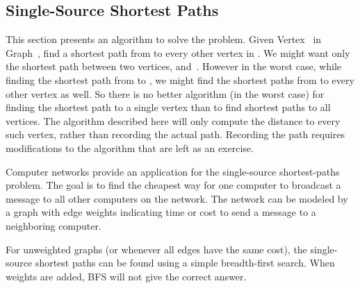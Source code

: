 
\subsection{Single-Source Shortest Paths}
\label{SSSP}

This section presents an algorithm to solve the
  problem.
Given Vertex~ in Graph~, find a shortest path from
 to every other vertex in .
We might want only the shortest path between two vertices,
 and~.
However in the worst case, while finding the shortest path from
 to , we might find the shortest paths from 
to every other vertex as well.
So there is no better algorithm (in the worst case) for
finding the shortest path to a single vertex than to find shortest
paths to all vertices.
The algorithm described here will only compute the distance to every
such vertex, rather than recording the actual path.
Recording the path requires modifications to the algorithm that
are left as an exercise.

Computer networks provide an application for the single-source
shortest-paths problem.
The goal is to find the cheapest way for one computer to broadcast
a message to all other computers on the network.
The network can be modeled by a graph with edge weights indicating time or
cost to send a message to a neighboring computer.

For unweighted graphs (or whenever all edges have the same cost), the
single-source shortest paths can be found using a simple breadth-first
search.
When weights are added, BFS will not give the correct answer.


